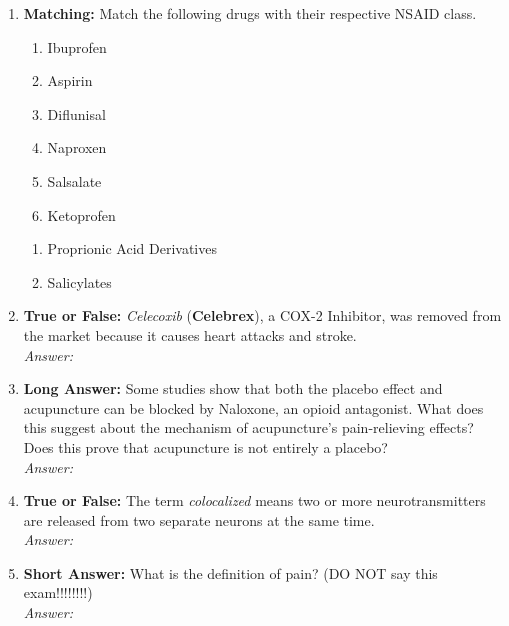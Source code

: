 \begin{enumerate}[label=\textbf{Q3.2.\arabic*}]
    \item \textbf{Matching:} Match the following drugs with their respective NSAID class.
    \begin{wordbox}
        \begin{enumerate}
            \item Ibuprofen
            \item Aspirin
            \item Diflunisal
            \item Naproxen
            \item Salsalate
            \item Ketoprofen
        \end{enumerate}
    \end{wordbox}
    \begin{enumerate}[label=(\arabic*)]
        \item Proprionic Acid Derivatives \quad \dotfill \quad \underline{\hspace{4cm}}
        \item Salicylates \quad \dotfill \quad \underline{\hspace{4cm}}
    \end{enumerate}

    \item \textbf{True or False:} \textit{Celecoxib} (\textbf{Celebrex}), a COX-2 Inhibitor, was removed from the market because it causes heart attacks and stroke. \\
        \textit{Answer:} %

    \item \textbf{Long Answer:} Some studies show that both the placebo effect and acupuncture can be blocked by Naloxone, an opioid antagonist. What does this suggest about the mechanism of acupuncture’s pain-relieving effects? Does this prove that acupuncture is not entirely a placebo? \\
        \textit{Answer:} \\[2cm] %
    
    \item \textbf{True or False:} The term \textit{colocalized} means two or more neurotransmitters are released from two separate neurons at the same time. \\ 
        \textit{Answer:} %

    \item \textbf{Short Answer:} What is the definition of pain? (DO NOT say this exam!!!!!!!!) \\
        \textit{Answer:} %
\end{enumerate}

